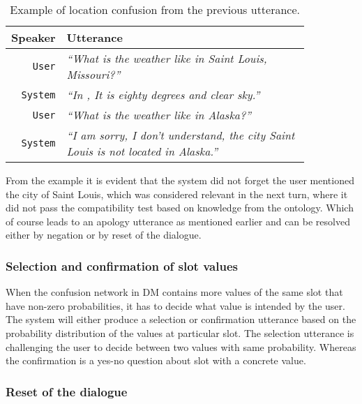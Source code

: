 \begin{table}[h]
\centering
\begin{tabular}{ | r | p{0.85\linewidth} | } \hline
	Speaker & Utterance \\ \hline
	\texttt{User} & \textit{``What is the weather like in Saint Louis, Missouri?''} \\ \hline
	\texttt{System} & \textit{``In , It is eighty degrees and clear sky.''} \\ \hline
	\texttt{User} & \textit{``What is the weather like in Alaska?''} \\ \hline
	\texttt{System} & \textit{``I am sorry, I don't understand, the city Saint Louis is not located in Alaska.''} \\ \hline
\end{tabular}
\caption[Orthogonal time queries]{Example of location confusion from the previous utterance.}
\label{table:confusion}
\end{table}

From the example it is evident that the system did not forget the user mentioned the city of Saint Louis, which was considered relevant in the next turn, where it did not pass the compatibility test based on knowledge from the ontology.
Which of course leads to an apology utterance as mentioned earlier and can be resolved either by negation or by reset of the dialogue.


\subsubsection{Selection and confirmation of slot values}

When the confusion network in DM contains more values of the same slot that have non-zero probabilities, it has to decide what value is intended by the user.
The system will either produce a selection or confirmation utterance based on the probability distribution of the values at particular slot.
The selection utterance is challenging the user to decide between two values with same probability.
Whereas the confirmation is a yes-no question about slot with a concrete value.

\subsubsection{Reset of the dialogue}

